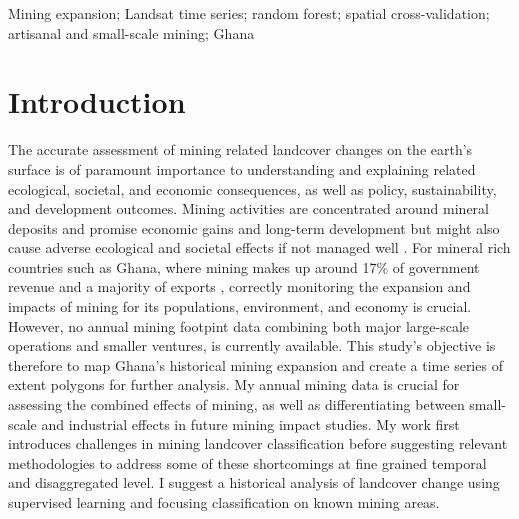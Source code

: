 \documentclass[]{interact}
\begin{document}
\begin{keywords}
Mining expansion; Landsat time series; random forest; spatial cross-validation;
artisanal and small-scale mining; Ghana
\end{keywords}

\linenumbers

\section{Introduction}
The accurate assessment of mining related landcover changes on the earth's surface is of paramount importance to understanding and explaining related ecological, societal, and economic consequences, as well as policy, sustainability, and development outcomes. Mining activities are concentrated around mineral deposits and promise economic gains and long-term development \citep{knutsen2017Mining,andrews2018Land} but might also cause adverse ecological and societal effects if not managed well \citep{mensah2015Environmental}. For mineral rich countries such as Ghana, where mining makes up around 17\% of government revenue and a majority of exports \citep[p.~3]{siachiwena2025benefits}, correctly monitoring the expansion and impacts of mining for its populations, environment, and economy is crucial. However, no annual mining footpint data combining both major large-scale operations and smaller ventures, is currently available. This study's objective is therefore to map Ghana's historical mining expansion and create a time series of extent polygons for further analysis. My annual mining data is crucial for assessing the combined effects of mining, as well as differentiating between small-scale and industrial effects in future mining impact studies. My work first introduces challenges in mining landcover classification before suggesting relevant methodologies to address some of these shortcomings at fine grained temporal and disaggregated level. I suggest a historical analysis of landcover change using supervised learning and focusing classification on known mining areas.
\end{document}
